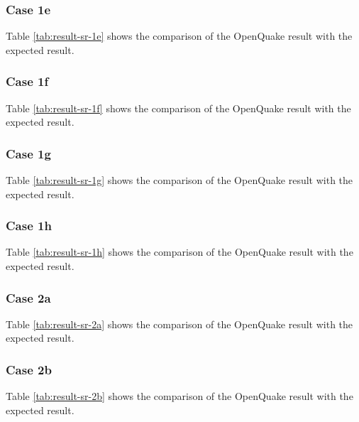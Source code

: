 \subsubsection{Case 1e}


Table \ref{tab:result-sr-1e} shows the comparison of the OpenQuake result with the expected result.

\subsubsection{Case 1f}


Table \ref{tab:result-sr-1f} shows the comparison of the OpenQuake result with the expected result.

\subsubsection{Case 1g}


Table \ref{tab:result-sr-1g} shows the comparison of the OpenQuake result with the expected result.

\subsubsection{Case 1h}


Table \ref{tab:result-sr-1h} shows the comparison of the OpenQuake result with the expected result.

\subsubsection{Case 2a}

Table \ref{tab:result-sr-2a} shows the comparison of the OpenQuake result with the expected result.

\subsubsection{Case 2b}

Table \ref{tab:result-sr-2b} shows the comparison of the OpenQuake result with the expected result.

